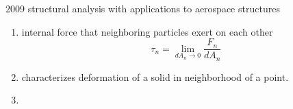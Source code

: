 \documentclass[11pt]{article}
\begin{document}
\begin{center}
    2009 structural analysis with applications to aerospace structures
\end{center}

\renewcommand{\linkbook}[3][../../readings/text_2009_structural_analysis_with_applications_to_aerospace_structures.pdf]{
    \noindent\href[page=#2]{#1}{\urlstyle{rm}{#3}}}


\begin{enumerate}
    \item {} internal force that neighboring particles exert on each other 
    \[
        \tau_n = \lim_{dA_n \to 0} \frac{F_n}{dA_n}    
    \]
    \item {} characterizes deformation of a solid in neighborhood of a point.
    \item 
\end{enumerate}
\end{document}
